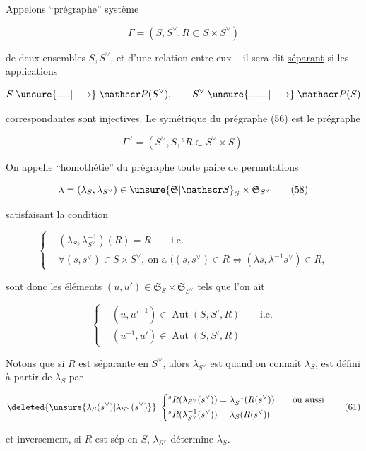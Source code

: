  Appelons ``prégraphe''  système

\[
\Gamma=(S,S^\vee,R\subset S\times S^\vee) \tag*{(56)}
\]

de deux ensembles $S,S^\vee$, et d'une relation entre eux -- il sera dit \uline{séparant} si les applications

\[
S\mathrel{\unsure{\rule{1.35em}{0.35pt}|\longrightarrow}}\mathscr P(S^\vee),\qquad S^\vee\mathrel{\unsure{\rule{2em}{0.35pt}|\longrightarrow}}\mathscr P(S)
\]

correspondantes sont injectives. Le symétrique du prégraphe (56) est le prégraphe

\[
\Gamma^\vee=(S^\vee,S,{}^sR\subset S^\vee\times S). \tag*{(57)}
\]

On appelle ``\uline{homothétie}'' du prégraphe toute paire de permutations

\[
\lambda=(\lambda_S,\lambda_{S^\vee})\in\unsure{\mathfrak S|\mathscr S}_S\times\mathfrak S_{S^\vee} \tag*{(58)}
\]

satisfaisant la condition

\[
\left\{\begin{aligned}
&(\lambda_S,\lambda_{S^\vee}^{-1})(R)=R\qquad\text{i.e.}\\
&\forall(s,s^\vee)\in S\times S^\vee,\ \text{on a }\bigl((s,s^\vee)\in R\iff(\lambda s,\lambda^{-1}s^\vee)\in R,
\end{aligned}\right. \tag*{(59)}
\]

 sont donc les éléments   $(u,u')\in\mathfrak S_S\times\mathfrak S_{S^\vee}$ tels que l'on ait

\[
\left\{\begin{aligned}
&(u,u'^{-1})\in\operatorname{Aut}(S,S',R)\qquad\text{i.e.}\\
&(u^{-1},u')\in\operatorname{Aut}(S,S',R)
\end{aligned}\right. \tag*{(60)}
\]

Notons que si $R$ est séparante en $S^\vee$, alors $\lambda_{S^\vee}$ est  quand on connaît $\lambda_S$,  est défini à partir de $\lambda_S$ par

\[
\deleted{\unsure{\lambda_S(s^\vee)|\lambda_{S^\vee}(s^\vee)}}\
\left\{\begin{aligned}
&{}^sR(\lambda_{S^\vee}(s^\vee))=\lambda_S^{-1}(R(s^\vee))\qquad\text{ou aussi}\\
&{}^sR(\lambda_{S^\vee}^{-1}(s^\vee))=\lambda_S(R(s^\vee))
\end{aligned}\right. \tag*{(61)}
\]

et inversement, si $R$ est sép en $S$, $\lambda_{S^\vee}$ détermine $\lambda_S$.

